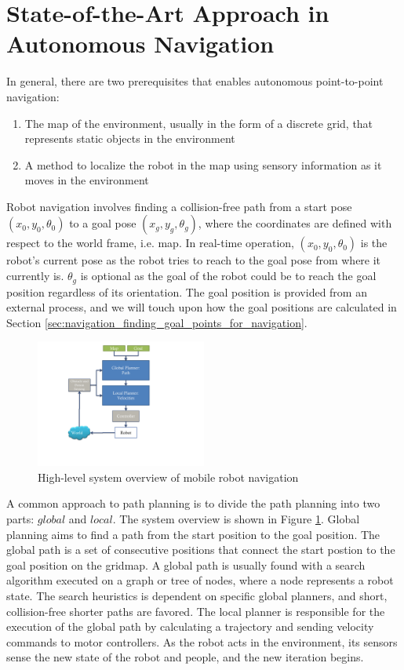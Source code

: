 \section{State-of-the-Art Approach in Autonomous Navigation}
\label{sec:navigation_contemporary_navigation_practices}

In general, there are two prerequisites that enables autonomous point-to-point navigation: 

\begin{enumerate}
\item The map of the environment, usually in the form of a discrete grid, that represents static objects in the environment
\item A method to localize the robot in the map using sensory information as it moves in the environment
\end{enumerate}

Robot navigation involves finding a collision-free path from a start pose $(x_{0},y_{0},\theta_0)$ to a goal pose $(x_{g},y_{g},\theta_g)$, where the coordinates are defined with respect to the world frame, i.e. map. In real-time operation, $(x_{0},y_{0}, \theta_0)$ is the robot's current pose as the robot tries to reach to the goal pose from where it currently is. $\theta_g$ is optional as the goal of the robot could be to reach the goal position regardless of its orientation. The goal position is provided from an external process, and we will touch upon how the goal positions are calculated in Section \ref{sec:navigation_finding_goal_points_for_navigation}.


\begin{figure}[ht!]
\centering
\includegraphics[width=0.5\textwidth]{pics/navigation_overview}
\caption{High-level system overview of mobile robot navigation}
\label{fig:navigation_overview}
\end{figure}

A common approach to path planning is to divide the path planning into two parts: $global$ and $local$. The system overview is shown in Figure \ref{fig:navigation_overview}. Global planning aims to find a path from the start position to the goal position. The global path is a set of consecutive positions that connect the start postion to the goal position on the gridmap. A global path is usually found with a search algorithm executed on a graph or tree of nodes, where a node represents a robot state. The search heuristics is dependent on specific global planners, and short, collision-free shorter paths are favored. The local planner is responsible for the execution of the global path by calculating a trajectory and sending velocity commands to motor controllers. As the robot acts in the environment, its sensors sense the new state of the robot and people, and the new iteration begins. 

